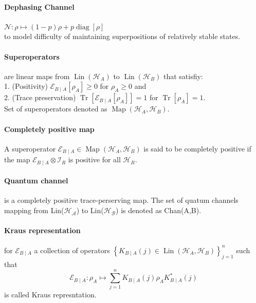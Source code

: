 \paragraph{Dephasing Channel}$\mathcal{N}: \rho \mapsto(1-p) \rho+p \operatorname{diag}[\rho]$\\
to model difficulty of maintaining superpositions of relatively stable states. 

\paragraph{Superoperators} are linear maps from $\operatorname{Lin}\left(\mathcal{H}_A\right)$ to $\operatorname{Lin}\left(\mathcal{H}_B\right)$ that satisfiy:\\
1. (Positivity) $\mathcal{E}_{B \mid A}\left[\rho_A\right] \geq 0$ for $\rho_A \geq 0$ and\\
2. (Trace preservation) $\operatorname{Tr}\left[\mathcal{E}_{B \mid A}\left[\rho_A\right]\right]=1$ for $\operatorname{Tr}\left[\rho_A\right]=1$.\\
Set of superoperators denoted as $\operatorname{Map}\left(\mathcal{H}_A, \mathcal{H}_B\right)$.

\paragraph{Completely positive map} A superoperator $\mathcal{E}_{B \mid A} \in \operatorname{Map}\left(\mathcal{H}_A, \mathcal{H}_B\right)$ is said to be completely positive if the map $\mathcal{E}_{B \mid A} \otimes \mathcal{I}_R$ is positive for all $\mathcal{H}_R$.

\paragraph{Quantum channel} is a completely positive trace-perserving map. The set of quatum channels mapping from Lin($\mathcal{H_A}$)
to Lin($\mathcal{H_B}$) is denoted as Chan(A,B).

\paragraph{Kraus representation} for $\mathcal{E}_{B \mid A}$ a collection of operators $\left\{K_{B \mid A}(j) \in \operatorname{Lin}\left(\mathcal{H}_A, \mathcal{H}_B\right)\right\}_{j=1}^n$ such that 
$$\mathcal{E}_{B \mid A}: \rho_A \mapsto \sum_{j=1}^n K_{B \mid A}(j) \rho_A K_{B \mid A}^*(j)$$ 
is called Kraus represntation. 


